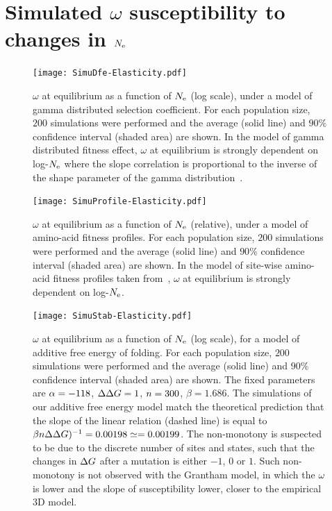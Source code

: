 \section{Simulated \texorpdfstring{$\omega$}{ω} susceptibility to changes in \texorpdfstring{$N_{\mathrm{e}}$}{Nₑ}}
\label{sec:simulated-omega-susceptibility-to-changes-Ne}

\begin{figure}[H]
	\centering
	\texttt{[image: SimuDfe-Elasticity.pdf]}
	\caption[$\omega$ susceptibility with gamma distributed selection coefficient]{
	$\omega$ at equilibrium as a function of $N_{\mathrm{e}}$ (log scale), under a model of gamma distributed selection coefficient.
	For each population size, $200$ simulations were performed and the average (solid line) and $90\%$ confidence interval (shaded area) are shown.
	In the model of gamma distributed fitness effect, $\omega$ at equilibrium is strongly dependent on log-$N_{\mathrm{e}}$ where the slope correlation is proportional to the inverse of the shape parameter of the gamma distribution~\citep{Welch2008}.
	}
\end{figure}

\begin{figure}[H]
	\centering
	\texttt{[image: SimuProfile-Elasticity.pdf]}
	\caption[$\omega$ susceptibility with amino-acid fitness profiles]{
	$\omega$ at equilibrium as a function of $N_{\mathrm{e}}$ (relative), under a model of amino-acid fitness profiles.
	For each population size, $200$ simulations were performed and the average (solid line) and $90\%$ confidence interval (shaded area) are shown.
	In the model of site-wise amino-acid fitness profiles taken from~\citep{Bloom2017}, $\omega$ at equilibrium is strongly dependent on log-$N_{\mathrm{e}}$.
	}
\end{figure}

\begin{figure}[H]
	\centering
	\texttt{[image: SimuStab-Elasticity.pdf]}
	\caption[$\omega$ susceptibility with additive free energy of folding]{
	$\omega$ at equilibrium as a function of $N_{\mathrm{e}}$ (log scale), for a model of additive free energy of folding.
	For each population size, $200$ simulations were performed and the average (solid line) and $90\%$ confidence interval (shaded area) are shown.
	The fixed parameters are $\alpha=-118$, $\Delta \Delta G=1$, $n=300$, $\beta=1.686$.
	The simulations of our additive free energy model match the theoretical prediction that the slope of the linear relation (dashed line) is equal to $\beta n \Delta \Delta G)^{-1} = 0.00198 \simeq = 0.00199$.
	The non-monotony is suspected to be due to the discrete number of sites and states, such that the changes in $\Delta G$ after a mutation is either $-1$, $0$ or $1$. Such non-monotony is not observed with the Grantham model, in which the $\omega$ is lower and the slope of susceptibility lower, closer to the empirical 3D model.
	}
\end{figure}

